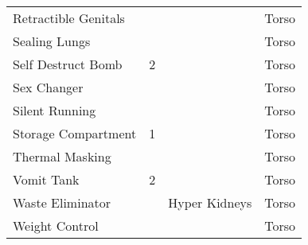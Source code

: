\documentclass[twoside]{book}
\begin{document}
\begin{longtable}{p{1.25in}p{2em}ll}
  \raggedright
           Retractible Genitals 
  &
  
  &
  
  &
   Torso 
  \tabularnewline
      
  \raggedright
           Sealing Lungs 
  &
  
  &
  
  &
   Torso 
  \tabularnewline
      
  \raggedright
           Self Destruct Bomb 
  &
   2 
  &
  
  &
   Torso 
  \tabularnewline
      
  \raggedright
           Sex Changer 
  &
  
  &
  
  &
   Torso 
  \tabularnewline
      
  \raggedright
           Silent Running 
  &
  
  &
  
  &
   Torso 
  \tabularnewline
      
  \raggedright
           Storage Compartment 
  &
   1 
  &
  
  &
   Torso 
  \tabularnewline
      
  \raggedright
           Thermal Masking 
  &
  
  &
  
  &
   Torso 
  \tabularnewline
      
  \raggedright
           Vomit Tank 
  &
   2 
  &
  
  &
   Torso 
  \tabularnewline
      
  \raggedright
           Waste Eliminator 
  &
  
  &
   Hyper Kidneys 
  &
   Torso 
  \tabularnewline
      
  \raggedright
           Weight Control 
  &
  
  &
  
  &
   Torso 
  \tabularnewline
      
\end{longtable}
    
\end{document}
